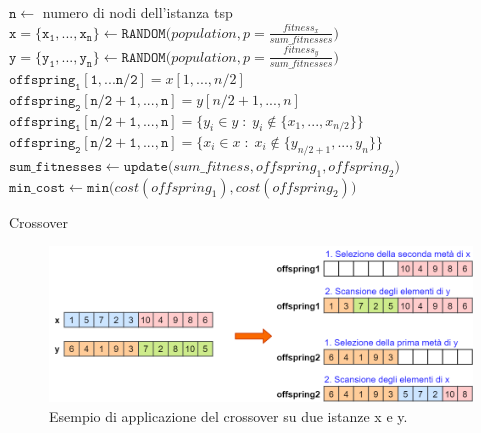 \begin{algorithm}[h]
\DontPrintSemicolon
{}
\BlankLine 
$\mathtt{n}\gets$ numero di nodi dell'istanza tsp\;
$\mathtt{x=\{x_1,...,x_n\} \gets RANDOM(}population, p=\frac{fitness_x}{sum\_fitnesses})$\;
$\mathtt{y=\{y_1,...,y_n\} \gets RANDOM(}population, p=\frac{fitness_y}{sum\_fitnesses})$\;
 \BlankLine \BlankLine
 $\mathtt{offspring_1[1,...n/2]}=x[1,..., n/2]$\;
 $\mathtt{offspring_2[n/2+1,...,n]}=y[n/2+1,..., n]$\;
 $\mathtt{offspring_1[n/2+1,...,n]}=\{y_i\in y\; :\; y_i\not\in\{x_1, ..., x_{n/2}\}\}$\;
 $\mathtt{offspring_2[n/2+1,...,n]}=\{x_i\in x\; :\; x_i\not\in\{y_{n/2+1}, ..., y_{n}\}\}$\;
  \BlankLine
  $\mathtt{sum\_fitnesses\gets update(}sum\_fitness, offspring_1, offspring_2\mathtt{)}$\;
  \BlankLine  
  $\mathtt{min\_cost \gets min(}cost(offspring_1), cost(offspring_2)\mathtt{)}$\;  
  \BlankLine
\caption{Crossover}\label{crossover_pseudo}
\end{algorithm}

\begin{figure}[h]
\begin{center} 
  \includegraphics[scale=0.37]{Images/crossover}
  \caption{\footnotesize{Esempio di applicazione del crossover su due istanze x e y.}}
  \label{crossover}
\end{center}
\end{figure}

